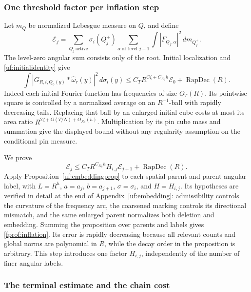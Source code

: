 \subsubsection*{One threshold factor per inflation step}

Let \(m_Q\) be normalized Lebesgue measure on \(Q\), and define
$$
 \mathcal E_j=
 \sum_{Q_j\ \mathrm{active}}\sigma_i(Q_j^+)
 \sum_{\alpha\text{ at level }j-1}
       \int|F_{Q_j,\alpha}|^2\,dm_{Q_j^+}.
$$
The level-zero angular sum consists only of the root. Initial
localization and \eqref{uf:initialidentity} give
$$
 \int|G_{R,i,Q_0(y)}*\widehat\omega_r(y)|^2\,d\sigma_i(y)
 \leq C_T R^{C\zeta+C_{K_0}h}\mathcal E_0
       +\operatorname{RapDec}(R).
$$
Indeed each initial Fourier function has frequencies of size \(O_T(R)\).
Its pointwise square is controlled by a normalized average on an
\(R^{-1}\)-ball with rapidly decreasing tails. Replacing that ball by
an enlarged initial cube costs at most its area ratio
\(R^{2\zeta+O(T/N)+O_{K_0}(h)}\). Multiplication by its pin cube mass
and summation give the displayed bound without any regularity assumption
on the conditional pin measure.

We prove
\begin{equation}\label{fprof:inflation}
 \mathcal E_j\leq C_T R^{C_{K_0}h}H_{i,j}\mathcal E_{j+1}
                   +\operatorname{RapDec}(R).
\end{equation}
Apply Proposition~\ref{uf:embeddingprop} to each spatial parent and
parent angular label, with \(L=R^h\), \(a=a_j\), \(b=a_{j+1}\),
\(\sigma=\sigma_i\), and \(H=H_{i,j}\). Its hypotheses are verified
in detail at the end of Appendix~\ref{uf:embedding}: admissibility controls
the curvature of the frequency arc, the coarsened marking controls its
directional mismatch, and the same enlarged parent normalizes both deletion
and embedding. Summing the proposition over parents and labels gives
\eqref{fprof:inflation}. Its error is rapidly decreasing because all relevant
counts and global norms are polynomial in \(R\), while the decay order in
the proposition is arbitrary. This step introduces one factor \(H_{i,j}\),
independently of the number of finer angular labels.

\subsubsection*{The terminal estimate and the chain cost}

